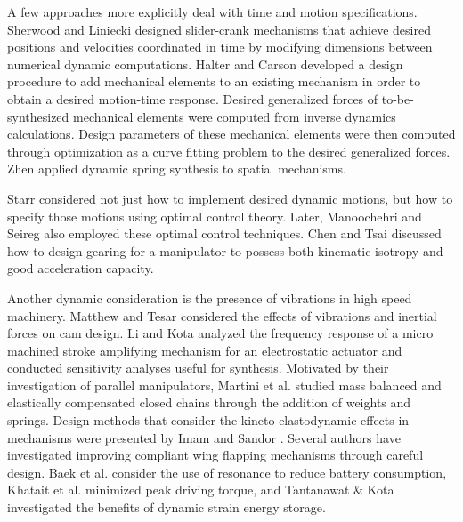 \documentclass[journal]{IEEEtran}
\begin{document}
A few approaches more explicitly deal with time and motion specifications.  
Sherwood \cite{sherwoodDynamicSynthesisMechanism1968} and Liniecki \cite{linieckiSynthesisSlidercrankMechanism1970} designed slider-crank mechanisms that achieve desired positions and velocities coordinated in time by modifying dimensions between numerical dynamic computations.
Halter and Carson \cite{halterMechanismForceSystemSynthesis1975} developed a design procedure to add mechanical elements to an existing mechanism in order to obtain a desired motion-time response.  Desired generalized forces of to-be-synthesized mechanical elements were computed from inverse dynamics calculations.  Design parameters of these mechanical elements were then computed through optimization as a curve fitting problem to the desired generalized forces.  Zhen \cite{zhenAnalyticalSynthesisSpring1988} applied dynamic spring synthesis to spatial mechanisms.


Starr \cite{starrDynamicSynthesisConstraint1973} considered not just how to implement desired dynamic motions, but how to specify those motions using optimal control theory.  
Later, Manoochehri and Seireg \cite{manoochehriComputerBasedMethodologyForm1990} also employed these optimal control techniques.  Chen and Tsai \cite{chenKinematicDynamicSynthesis1993} discussed how to design gearing for a manipulator to possess both kinematic isotropy and good acceleration capacity.


Another dynamic consideration is the presence of vibrations in high speed machinery.  
Matthew and Tesar \cite{matthewCamSystemDesign1976} considered the effects of vibrations and inertial forces on cam design.
Li and Kota \cite{liDynamicAnalysisCompliant2002} analyzed the frequency response of a micro machined stroke amplifying mechanism for an electrostatic actuator and conducted sensitivity analyses useful for synthesis.
Motivated by their investigation of parallel manipulators, Martini et al. \cite{martiniElastodynamicBehaviorBalanced2014} studied mass balanced and elastically compensated closed chains through the addition of weights and springs.
Design methods that consider the kineto-elastodynamic effects in mechanisms were presented by Imam and Sandor \cite{imamHighSpeedMechanismDesign1975}.
Several authors have investigated improving compliant wing flapping mechanisms through careful design.
Baek et al. \cite{baekEfficientResonantDrive2009} consider the use of resonance to reduce battery consumption, Khatait et al. \cite{khataitCompliantDesignFlapping2006} minimized peak driving torque, and Tantanawat \& Kota \cite{tantanawatDesignCompliantMechanisms2007} investigated the benefits of dynamic strain energy storage.
\end{document}
